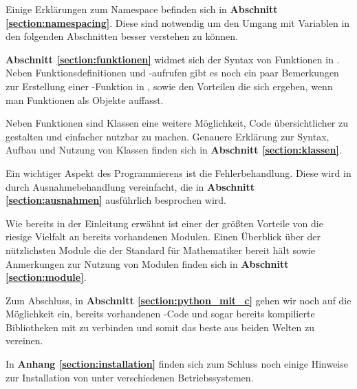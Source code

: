 Einige Erklärungen zum Namespace befinden sich in \textbf{Abschnitt \ref{section:namespacing}}. Diese sind notwendig um den Umgang 
mit Variablen in den folgenden Abschnitten besser verstehen zu können.

\textbf{Abschnitt \ref{section:funktionen}} widmet sich der Syntax von Funktionen in \Python. Neben Funktionsdefinitionen und -aufrufen 
gibt es noch ein paar Bemerkungen zur Erstellung einer -Funktion in \Python, sowie den Vorteilen die sich ergeben, wenn 
man Funktionen als Objekte auffasst.

Neben Funktionen sind Klassen eine weitere Möglichkeit, Code übersichtlicher zu gestalten und einfacher nutzbar zu machen. Genauere 
Erklärung zur Syntax, Aufbau und Nutzung von Klassen finden sich in \textbf{Abschnitt \ref{section:klassen}}.  

Ein wichtiger Aspekt des Programmierens ist die Fehlerbehandlung. Diese wird in \Python durch Ausnahmebehandlung vereinfacht, die in 
\textbf{Abschnitt \ref{section:ausnahmen}} ausführlich besprochen wird.

Wie bereits in der Einleitung erwähnt ist einer der größten Vorteile von \Python die riesige Vielfalt an bereits vorhandenen Modulen.
Einen Überblick über der nützlichsten Module die der \Python Standard für Mathematiker bereit hält sowie Anmerkungen zur Nutzung von Modulen 
finden sich in \textbf{Abschnitt \ref{section:module}}.

Zum Abschluss, in \textbf{Abschnitt \ref{section:python_mit_c}} gehen wir noch auf die Möglichkeit ein, bereits vorhandenen 
\CC-Code und sogar bereits kompilierte Bibliotheken mit \Python zu verbinden und somit das beste aus beiden Welten zu vereinen.

In \textbf{Anhang \ref{section:installation}} finden sich zum Schluss noch einige Hinweise zur Installation von 
\Python unter verschiedenen Betriebssystemen.
